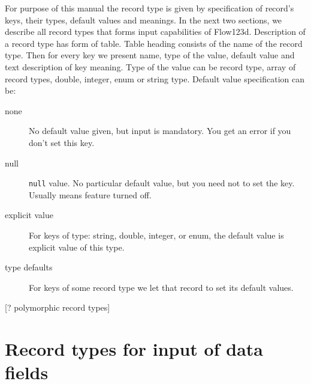 For purpose of this manual the record type is given by specification of record's keys, their types, default values and meanings.
In the next two sections, we describe all record types that forms input capabilities of Flow123d. Description of a record type 
has form of table. Table heading consists of the name of the record type. Then for every key we present name, type of the value,
default value and text description of key meaning. Type of the value can be record type, array of record types, double, integer, enum or 
string type. Default value specification can be:
\begin{description} 
 \item[none] No default value given, but input is mandatory. You get an error if you don't set this key.
 \item[null] \verb'null' value. No particular default value, but you need not to set the key. Usually means feature turned off.
 \item[explicit value] For keys of type: string, double, integer, or enum, the default value is explicit value of this type.
 \item[type defaults] For keys of some record type we let that record to set its default values.
\end{description}

[? polymorphic record types]


\section{Record types for input of data fields}


\newenvironment{recordtype}[2]
{\par
 \vskip 2ex
 \noindent%
 record type: {\bf #1}#2
 \par%
 \vskip 0.5ex
 \hrule%
 \vskip 0.3ex
 \hrule
 \begingroup%
  \addtolength{\leftskip}{3em}%
  \gdef\keyitem##1##2##3{%
    \par
    \vskip 0.3ex
    \noindent%
    \hspace{-3em}{\bf\tt ##1} = {\it \textless ##2\textgreater} \hfill \makebox[0.4\textwidth][l]{DEFAULT: {##3}\hfil}%
    \par
  }%
}{%
  \vskip 0.7ex  
  \hrule%
  \vskip 0.5ex
  \endgroup%
}

\def\enumhead#1{
{\bf #1} enum cases:
}
\def\enumitem#1#2{
  \par{\tt #1=#2 \hspace{2em}}
}

